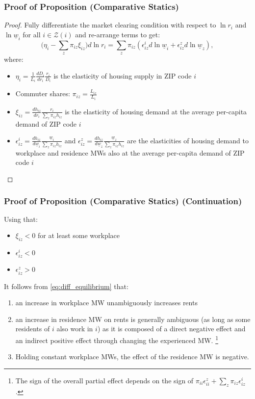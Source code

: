 \documentclass[aspectratio=169, t]{beamer}
\newcommand{\Z}{\mathcal{Z}}
\newcommand{\MW}{\underline{w}}
\begin{document}
\begin{frame}[label = proof_comp_stat]
\frametitle{Proof of Proposition (Comparative Statics)}

\begin{proof}
    Fully differentiate the market clearing condition with respect to $\ln r_i$ and 
    $\ln \MW_i$ for all $i\in\Z(i)$ and re-arrange terms to get:
    \begin{equation}\label{eq:diff_equilibrium}
        \Big(\eta_i - \sum_z \pi_{iz} \xi_{iz} \Big) d \ln r_i
        = 
        \sum_z \pi_{iz} \left(\epsilon_{iz}^i d \ln \MW_i 
                            + \epsilon_{iz}^z d \ln \MW_z \right) ,
    \end{equation}
    where:
    \begin{itemize}
        \item $\eta_i = \frac{1}{L_i} \frac{d D_i}{d r_i} \frac{r_i}{D_i}$ is the elasticity 
        of housing supply in ZIP code $i$
        \item Commuter shares: $\pi_{iz} = \frac{L_{iz}}{L_i}$
        \item $\xi_{iz} = \frac{d h_{iz}}{d r_i} \frac{r_i}{\sum_z \pi_{iz} h_{iz}}$ is the 
        elasticity of housing demand at the average per-capita demand of ZIP code $i$
        \item  $\epsilon_{iz}^i = \frac{d h_{iz}}{d \MW_i} \frac{\MW_i}{\sum_z \pi_{iz} h_{iz}}$ and 
        $\epsilon_{iz}^z = \frac{d h_{iz}}{d \MW_z} \frac{\MW_z}{\sum_z \pi_{iz} h_{iz}}$ 
        are the elasticities of housing demand to workplace and residence MWs also at
         the average per-capita demand of ZIP code $i$
    \end{itemize}
\end{proof}
\end{frame}

\begin{frame}
    \frametitle{Proof of Proposition (Comparative Statics) (Continuation)}
    
    Using that:
    \begin{itemize} 
        \item $\xi_{iz} < 0$ for at least some workplace
        \item $\epsilon_{iz}^i < 0$
        \item $\epsilon_{iz}^z > 0$
    \end{itemize}
    It follows from \eqref{eq:diff_equilibrium} that:
    \begin{enumerate}
        \item an increase in workplace MW unambiguously increases rents
        \item an increase in residence MW on rents is generally ambiguous 
        (as long as some residents of $i$ also work in $i$) as it is composed of a direct negative 
        effect and an indirect positive effect through changing the experienced MW. \footnote{The sign of the overall partial effect depends on the sign of 
    $\pi_{ii} \epsilon_{ii}^z + \sum_z \pi_{iz} \epsilon_{iz}^i$.}
        \item Holding constant workplace MWs, the effect of the residence MW is negative.
    \end{enumerate}    
\end{frame}
\end{document}
